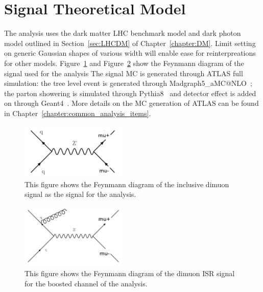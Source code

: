 \section{Signal Theoretical Model}
The analysis uses the dark matter LHC benchmark model and dark photon model outlined in Section~\ref{sec:LHCDM} of Chapter~\ref{chapter:DM}.
Limit setting on generic Gaussian shapes of various width will enable ease for reinterpreations for other models.
Figure~\ref{fig:dimuonFeynmann} and Figure~\ref{fig:dimuonISRFeynmann} show the Feynmann diagram of the signal used for the analysis 
The signal MC is generated through ATLAS full simulation: the tree level event is generated through Madgraph5\_aMC@NLO~\cite{MG2014}; the parton showering is simulated through Pythia8~\cite{PYTHIA2008} and detector effect is added on through Geant4~\cite{agostinelli2003geant4}. More details on the MC generation of ATLAS can be found in Chapter~\ref{chapter:common_analysis_items}.

\begin{figure}[!htb]
    \begin{center}
        \includegraphics[width=0.45\textwidth]{figures/chapter_dimuon/dimuonFeynman}
        \caption{
            This figure shows the Feynmann diagram of the inclusive dimuon signal as the signal for the analysis. 
        }
    \label{fig:dimuonFeynmann}
    \end{center}
\end{figure}
\FloatBarrier

\begin{figure}[!htb]
    \begin{center}
        \includegraphics[width=0.45\textwidth]{figures/chapter_dimuon/dimuonISRFeynmann}
        \caption{
        This figure shows the Feynmann diagram of the dimuon ISR signal for the boosted channel of the analysis. }
            \label{fig:dimuonISRFeynmann}
    \end{center}
\end{figure}
\FloatBarrier

